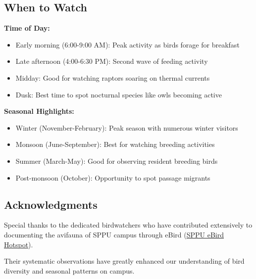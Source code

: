 \documentclass[a4paper,12pt,landscape]{memoir}
\newcommand{\introsection}[2]{%
  \begin{minipage}[t]{0.48\textwidth}
    \begin{mdframed}[
      linecolor=headingcolor,
      linewidth=1pt,
      roundcorner=5pt,
      leftmargin=0pt,
      rightmargin=0pt,
      backgroundcolor=headingcolor!5
    ]
      #1
    \end{mdframed}
  \end{minipage}\hfill
  \begin{minipage}[t]{0.48\textwidth}
    \begin{mdframed}[
      linecolor=headingcolor,
      linewidth=1pt,
      roundcorner=5pt,
      leftmargin=0pt,
      rightmargin=0pt,
      backgroundcolor=headingcolor!5
    ]
      #2
    \end{mdframed}
  \end{minipage}
  \newpage
}
\begin{document}
\introsection{%
  \section*{When to Watch}
  \textbf{Time of Day:}
  \begin{itemize}
  \item Early morning (6:00-9:00 AM): Peak activity as birds forage for breakfast
  \item Late afternoon (4:00-6:30 PM): Second wave of feeding activity
  \item Midday: Good for watching raptors soaring on thermal currents
  \item Dusk: Best time to spot nocturnal species like owls becoming active
  \end{itemize}

  \textbf{Seasonal Highlights:}
  \begin{itemize}
  \item Winter (November-February): Peak season with numerous winter visitors
  \item Monsoon (June-September): Best for watching breeding activities
  \item Summer (March-May): Good for observing resident breeding birds
  \item Post-monsoon (October): Opportunity to spot passage migrants
  \end{itemize}
}{%
  \section*{Acknowledgments}
  Special thanks to the dedicated birdwatchers 
  who have contributed extensively to documenting 
  the avifauna of SPPU campus through eBird 
(\href{https://ebird.org/hotspot/L1838309}{SPPU eBird Hotspot}).
   
  Their systematic observations have greatly enhanced our 
  understanding of bird diversity and seasonal patterns 
  on campus.
}
\end{document}
